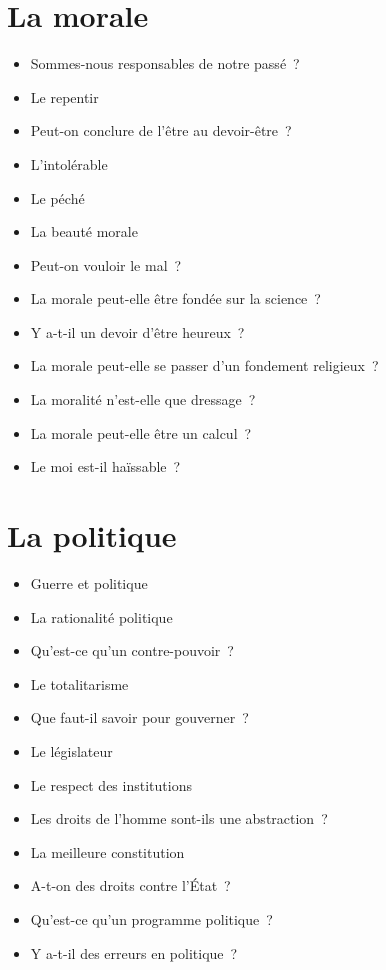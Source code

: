 \documentclass[a4paper,11pt]{article}
\newenvironment{liste}{\begin{itemize}}{\end{itemize}}
\begin{document}
\section{La morale}

\begin{liste}
\item Sommes-nous responsables de notre passé~?
\item Le repentir
\item Peut-on conclure de l'être au devoir-être~?
\item L'intolérable
\item Le péché
\item La beauté morale
\item Peut-on vouloir le mal~?
\item La morale peut-elle être fondée sur la science~?
\item Y a-t-il un devoir d'être heureux~?
\item La morale peut-elle se passer d'un fondement religieux~?
\item La moralité n'est-elle que dressage~?
\item La morale peut-elle être un calcul~?
\item Le moi est-il haïssable~?
\end{liste}


\section{La politique}

\begin{liste}
\item Guerre et politique
\item La rationalité politique
\item Qu'est-ce qu'un contre-pouvoir~?
\item Le totalitarisme
\item Que faut-il savoir pour gouverner~?
\item Le législateur
\item Le respect des institutions
\item Les droits de l'homme sont-ils une abstraction~?
\item La meilleure constitution
\item A-t-on des droits contre l'État~?
\item Qu'est-ce qu'un programme politique~?
\item Y a-t-il des erreurs en politique~?
\end{liste}
\end{document}

